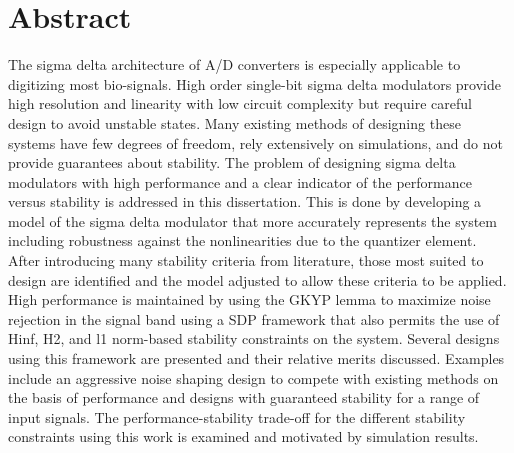 
\chapter{Abstract}

The sigma delta architecture of \gls{A/D} converters is especially applicable to digitizing most bio-signals. High order single-bit sigma delta modulators provide high resolution and linearity with low circuit complexity but require careful design to avoid unstable states. Many existing methods of designing these systems have few degrees of freedom, rely extensively on simulations, and do not provide guarantees about stability. The problem of designing sigma delta modulators with high performance and a clear indicator of the performance versus stability is addressed in this dissertation. This is done by developing a model of the sigma delta modulator that more accurately represents the system including robustness against the nonlinearities due to the quantizer element. After introducing many stability criteria from literature, those most suited to design are identified and the model adjusted to allow these criteria to be applied. High performance is maintained by using the \gls{GKYP} lemma to maximize noise rejection in the signal band using a \gls{SDP} framework that also permits the use of \gls{Hinf}, \gls{H2}, and \gls{l1} norm-based stability constraints on the system. Several designs using this framework are presented and their relative merits discussed. Examples include an aggressive noise shaping design to compete with existing methods on the basis of performance and designs with guaranteed stability for a range of input signals. The performance-stability trade-off for the different stability constraints using this work is examined and motivated by simulation results.

